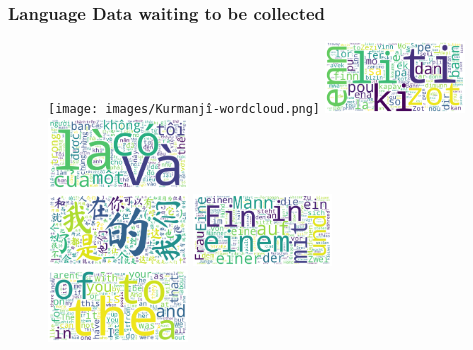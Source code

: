 \documentclass[aspectratio=169]{beamer}
\begin{document}
\begin{frame}[fragile]
	\frametitle{Language Data waiting to be collected}
    \begin{figure}
	    \centering
	    \texttt{[image: images/Kurmanjî-wordcloud.png]}%
        \includegraphics[width=0.33\textwidth]{images/Morisien-wordcloud.png}%
        \includegraphics[width=0.33\textwidth]{images/Vietnamese-wordcloud.png}
        \\
        \includegraphics[width=0.33\textwidth]{images/Chinese-wordcloud.png}%
        \includegraphics[width=0.33\textwidth]{images/German-wordcloud.png}%
        \includegraphics[width=0.33\textwidth]{images/English-wordcloud.png}
	\end{figure}
\end{frame}
\end{document}
